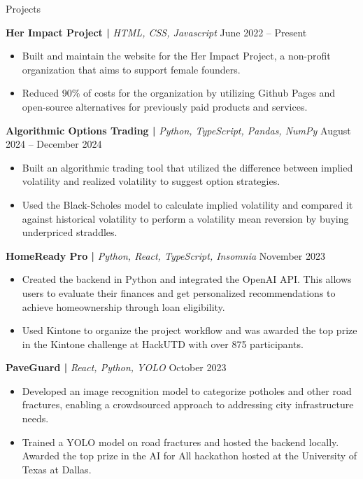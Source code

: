 \documentclass[]{mcdowellcv}
\begin{document}
	\begin{cvsection}{Projects}
		\begin{cvsubsection}{}{}{}	
				\textbf{Her Impact Project | }\textit{HTML, CSS, Javascript} \hfill{June 2022 -- Present}
				\begin{itemize}
					\item Built and maintain the website for the Her Impact Project, a non-profit organization that aims to support female founders.
					\smallskip
					\item Reduced 90\% of costs for the organization by utilizing Github Pages and open-source alternatives for previously paid products and services.
				\end{itemize}
				\medskip
				\textbf{Algorithmic Options Trading | }\textit{Python, TypeScript, Pandas, NumPy} \hfill{August 2024 -- December 2024}
				\begin{itemize}
					\item Built an algorithmic trading tool that utilized the difference between implied volatility and realized volatility to suggest option strategies.
					\smallskip
					\item Used the Black-Scholes model to calculate implied volatility and compared it against historical volatility to perform a volatility mean reversion by buying underpriced straddles.
				\end{itemize}
				\medskip
				\textbf{HomeReady Pro | }\textit{Python, React, TypeScript, Insomnia} \hfill{November 2023} 
				\begin{itemize}
					\item Created the backend in Python and integrated the OpenAI API. This allows users to evaluate their finances and get personalized recommendations to achieve homeownership through loan eligibility. 
					\smallskip
					\item Used Kintone to organize the project workflow and was awarded the top prize in the Kintone challenge at HackUTD with over 875 participants.
				\end{itemize}
				\medskip
				\textbf{PaveGuard | }\textit{React, Python, YOLO} \hfill{October 2023}
				\begin{itemize}
					\item Developed an image recognition model to categorize potholes and other road fractures, enabling a crowdsourced approach to addressing city infrastructure needs.
					\smallskip
					\item Trained a YOLO model on road fractures and hosted the backend locally. Awarded the top prize in the AI for All hackathon hosted at the University of Texas at Dallas.
				\end{itemize}
		\end{cvsubsection}
	\end{cvsection}
\end{document}
